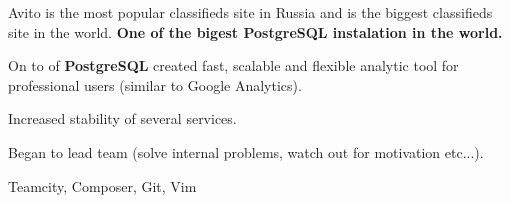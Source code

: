  Avito is the most popular classifieds site in Russia and is the biggest
  classifieds site in the world. \textbf{One of the bigest PostgreSQL
  instalation in the world.}
  \begin{gaas}
    \item On to of \textbf{PostgreSQL} created fast, scalable and flexible
      analytic tool for professional users (similar to Google Analytics).
    \item Increased stability of several services.
    \item Began to lead team (solve internal problems, watch out for
      motivation etc...).
  \end{gaas}
  \devtools
    Teamcity, Composer, Git, Vim


